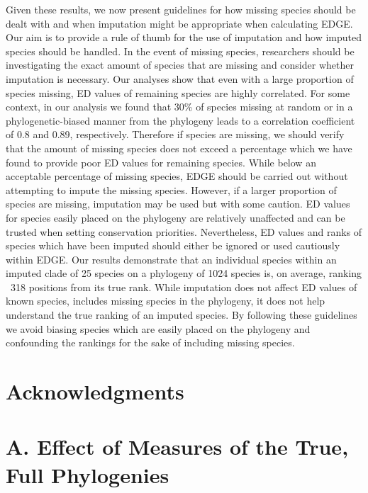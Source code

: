 \documentclass[12pt,english]{article}
\begin{document}
Given these results, we now present guidelines for how missing species should be
dealt with and when imputation might be appropriate when calculating EDGE. Our
aim is to provide a rule of thumb for the use of imputation and how imputed
species should be handled. In the event of missing species, researchers should
be investigating the exact amount of species that are missing and consider
whether imputation is necessary. Our analyses show that even with a large
proportion of species missing, ED values of remaining species are highly
correlated. For some context, in our analysis we found that 30\% of species
missing at random or in a phylogenetic-biased manner from the phylogeny leads to
a correlation coefficient of 0.8 and 0.89, respectively. Therefore if species
are missing, we should verify that the amount of missing species does not exceed
a percentage which we have found to provide poor ED values for remaining
species. While below an acceptable percentage of missing species, EDGE should be
carried out without attempting to impute the missing species. However, if a
larger proportion of species are missing, imputation may be used but with some
caution. ED values for species easily placed on the phylogeny are relatively
unaffected and can be trusted when setting conservation priorities.
Nevertheless, ED values and ranks of species which have been imputed should
either be ignored or used cautiously within EDGE. Our results demonstrate that
an individual species within an imputed clade of 25 species on a phylogeny of
1024 species is, on average, ranking \pm ~318 positions from its true rank.
While imputation does not affect ED values of known species, includes missing
species in the phylogeny, it does not help understand the true ranking of an
imputed species. By following these guidelines we avoid biasing species which
are easily placed on the phylogeny and confounding the rankings for the sake of
including missing species.

\section*{Acknowledgments}

\clearpage
\printbibliography

\clearpage
\appendix
\section*{A. Effect of Measures of the True, Full Phylogenies}
\end{document}
